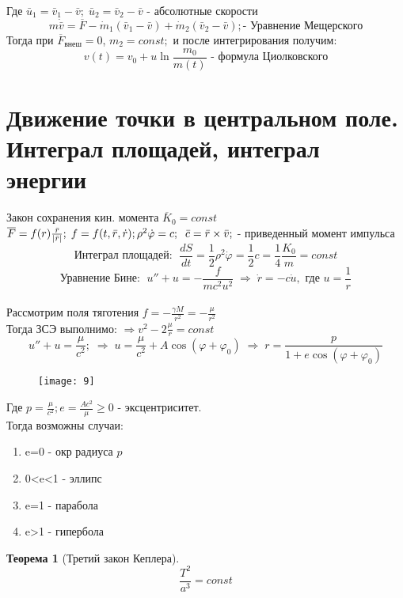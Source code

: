 \documentclass[12pt]{article}
\newtheorem{theorem}{Теорема}
\begin{document}
	Где $\bar{u}_1 = \bar{v}_1-\bar{v};\;\bar{u}_2 = \bar{v}_2-\bar{v} $ - абсолютные скорости 
	$$\boxed{m\dot{\bar{v}}=\overline{F} - \dot{m}_1(\bar{v}_1-\bar{v}) + \dot{m}_2 (\bar{v}_2-\bar{v});} \text{- Уравнение Мещерского} $$
	Тогда при $\overline{F}_{\text{внеш}}=0$, $m_2=const; $ и после интегрирования получим:
	$$\boxed{v(t)= v_0 + u \ln \frac{m_0}{m(t)}}\text{ - формула Циолковского} $$
\section{Движение точки в центральном поле. Интеграл площадей, интеграл энергии}	
	Закон сохранения кин. момента $\overline{K}_0 = const$ 
	$\overline{F}= f(r)\frac{\bar{r}}{|\bar{r}|}; \; f=f(t,\bar{r}, \dot{r});\\
	\rho^2\dot{\varphi} = c;  \;\; \bar{c}=\bar{r}\times \bar{v};$ -  приведенный момент импульса 
	$$ \textbf{Интеграл площадей: } \;\frac{dS}{dt} = \frac 1 2 \rho^2\dot{\varphi} = \frac 1 2 c = \frac 1 4 \frac{K_0}{m} = const$$
	$$ \textbf{Уравнение Бине: } \; u'' + u = -\frac{f}{mc^2u^2} \;\Rightarrow\; \dot{r} = -c \dot{u}, \text{  где } u=\frac{1}{r} $$
	\\
	Рассмотрим поля тяготения $f=-\frac{\gamma M}{r^2}= - \frac{\mu}{r^2}$\\
	Тогда ЗСЭ выполнимо: $\Rightarrow v^2-2\frac \mu r= const $\\
	$$u''+ u = \frac \mu {c^2}; \; \Rightarrow \; u = \frac \mu {c^2} + A\cos(\varphi + \varphi_0) \; \Rightarrow \; r=\frac{p}{1+ e\cos(\varphi + \varphi_0)}$$
		\begin{wrapfigure}{r}{0.3\textwidth}
		\vspace{-20pt}
		\begin{center}
			\texttt{[image: 9]}
		\end{center}
		\vspace{-10pt}
	\end{wrapfigure}
	Где $\boxed{p=\frac \mu {c^2}; e= \frac{Ac^2}{\mu}\geq 0}$ - эксцентриситет. \\
	Тогда возможны случаи:
	\vspace{-5pt}
	\begin{enumerate}
		\item e=0 - окр радиуса $p$
		\item 0<e<1 - эллипс
		\item e=1 - парабола
		\item e>1 - гипербола
	\end{enumerate}
	\begin{theorem}[Третий закон Кеплера] $$\frac{T^2}{a^3}= const $$
	\end{theorem}
\end{document}

